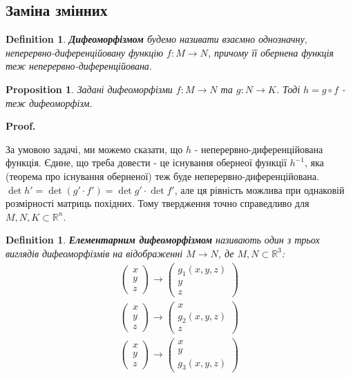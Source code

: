 \documentclass[a4paper, 10pt]{article}
\makeatletter
\def\qed{$\blacksquare$}
\theoremstyle{theoremdd}
\theoremstyle{theoremdd}
\newtheorem{definition}[theorem]{Definition}
\theoremstyle{theoremdd}
\theoremstyle{theoremdd}
\theoremstyle{theoremdd}
\newtheorem{proposition}[theorem]{Proposition}
\theoremstyle{theoremdd}
\theoremstyle{theoremdd}
\theoremstyle{theoremdd}
\renewenvironment{proof}[1][Proof.\\]{\par
\pushQED{\hfill \qed}%
\normalfont \topsep6\p@\@plus6\p@\relax
\trivlist
\item\relax
{\bfseries
#1\@addpunct{.}}\hspace\labelsep\ignorespaces
}{%
\popQED\endtrivlist\@endpefalse
}
\makeatother
\begin{document}
\subsection{Заміна змінних}
\iffalse
\begin{definition}
\textbf{Дифеоморфізмом} будемо називати взаємно однозначну, неперервно-диференційовану функцію $f: M \to N$, причому її обернена функція теж неперервно-диференційована.
\end{definition}

\begin{proposition}
Задані дифеоморфізми $f: M \to N$ та $g: N \to K$. Тоді $h = g \circ f$ - теж дифеоморфізм.
\end{proposition}

\begin{proof}
За умовою задачі, ми можемо сказати, що $h$ - неперервно-диференційована функція. Єдине, що треба довести - це існування обернеої функції $h^{-1}$, яка (теорема про існування оберненої) теж буде неперервно-диференційована.\\
$\det h' = \det (g' \cdot f') = \det g' \cdot \det f'$, але ця рівність можлива при однаковій розмірності матриць похідних. Тому твердження точно справедливо для $M,N,K \subset \mathbb{R}^n$.
\end{proof}

\begin{definition}
\textbf{Елементарним дифеоморфізмом} називають один з трьох виглядів дифеоморфізмів на відображенні $M \to N$, де $M,N \subset \mathbb{R}^3$:
\begin{align*}
\begin{pmatrix}
x \\ y \\ z
\end{pmatrix} \to \begin{pmatrix}
g_1(x,y,z) \\ y \\ z
\end{pmatrix} \\
\begin{pmatrix}
x \\ y \\ z
\end{pmatrix} \to \begin{pmatrix}
x \\ g_2(x,y,z) \\ z
\end{pmatrix} \\
\begin{pmatrix}
x \\ y \\ z
\end{pmatrix} \to \begin{pmatrix}
x \\ y \\ g_3(x,y,z)
\end{pmatrix}
\end{align*}
\end{definition}
\end{document}
